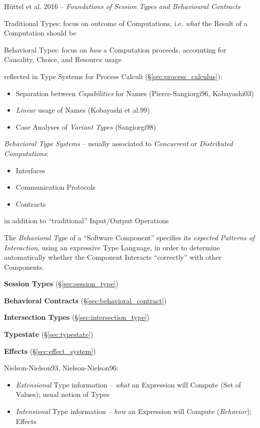 \asterism

H\"uttel et al. 2016 --
\emph{Foundations of Session Types and Behavioural Contracts}

Traditional Types: focus on outcome of Computations, i.e. \emph{what}
the Result of a Computation should be

Behavioral Types: focus on \emph{how} a Computation proceeds,
accounting for Causality, Choice, and Resource usage

reflected in Type Systems for Process Calculi
(\S\ref{sec:process_calculus}):
\begin{itemize}
  \item Separation between \emph{Capabilities} for Names
    (Pierce-Sangiorgi96, Kobayashi03)
  \item \emph{Linear} usage of Names (Kobayashi et al.99)
  \item Case Analyses of \emph{Variant Types} (Sangiorgi98)
\end{itemize}

\emph{Behavioral Type Systems} -- usually associated to
\emph{Concurrent} or \emph{Distributed Computations}:
\begin{itemize}
  \item Interfaces
  \item Communication Protocols
  \item Contracts
\end{itemize}
in addition to ``traditional'' Input/Output Operations

The \emph{Behavioral Type} of a ``Software Component'' specifies its
\emph{expected Patterns of Interaction}, using an expressive Type
Language, in order to determine automatically whether the Component
Interacts ``correctly'' with other Components.

\textbf{Session Types} (\S\ref{sec:session_type})

\textbf{Behavioral Contracts} (\S\ref{sec:behavioral_contract})

\textbf{Intersection Types} (\S\ref{sec:intersection_type})

\textbf{Typestate} (\S\ref{sec:typestate})

\textbf{Effects} (\S\ref{sec:effect_system})

Nielson-Nielson93, Nielson-Nielson96:

\begin{itemize}
  \item \emph{Extensional} Type information -- \emph{what} an
    Expression will Compute (Set of Values); usual notion of Types
  \item \emph{Intensional} Type information -- \emph{how} an
    Expression will Compute (\emph{Behavior}); Effects
\end{itemize}

